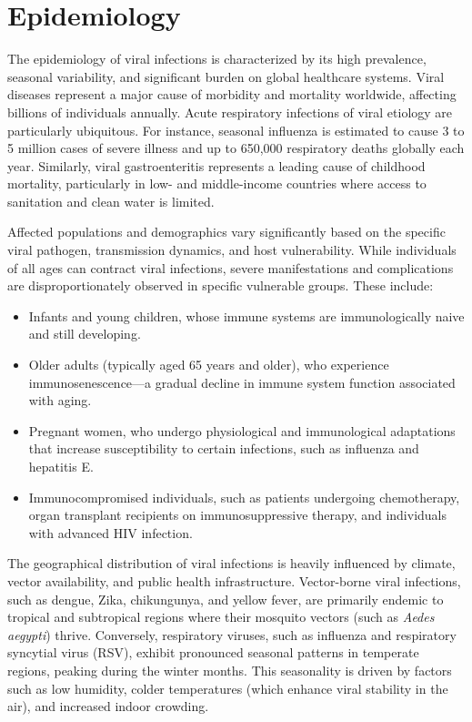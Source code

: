 \section*{Epidemiology}
The epidemiology of viral infections is characterized by its high prevalence, seasonal variability, and significant burden on global healthcare systems. Viral diseases represent a major cause of morbidity and mortality worldwide, affecting billions of individuals annually. Acute respiratory infections of viral etiology are particularly ubiquitous. For instance, seasonal influenza is estimated to cause 3 to 5 million cases of severe illness and up to 650,000 respiratory deaths globally each year. Similarly, viral gastroenteritis represents a leading cause of childhood mortality, particularly in low- and middle-income countries where access to sanitation and clean water is limited.

Affected populations and demographics vary significantly based on the specific viral pathogen, transmission dynamics, and host vulnerability. While individuals of all ages can contract viral infections, severe manifestations and complications are disproportionately observed in specific vulnerable groups. These include:
\begin{itemize}
    \item Infants and young children, whose immune systems are immunologically naive and still developing.
    \item Older adults (typically aged 65 years and older), who experience immunosenescence—a gradual decline in immune system function associated with aging.
    \item Pregnant women, who undergo physiological and immunological adaptations that increase susceptibility to certain infections, such as influenza and hepatitis E.
    \item Immunocompromised individuals, such as patients undergoing chemotherapy, organ transplant recipients on immunosuppressive therapy, and individuals with advanced HIV infection.
\end{itemize}

The geographical distribution of viral infections is heavily influenced by climate, vector availability, and public health infrastructure. Vector-borne viral infections, such as dengue, Zika, chikungunya, and yellow fever, are primarily endemic to tropical and subtropical regions where their mosquito vectors (such as \textit{Aedes aegypti}) thrive. Conversely, respiratory viruses, such as influenza and respiratory syncytial virus (RSV), exhibit pronounced seasonal patterns in temperate regions, peaking during the winter months. This seasonality is driven by factors such as low humidity, colder temperatures (which enhance viral stability in the air), and increased indoor crowding.

